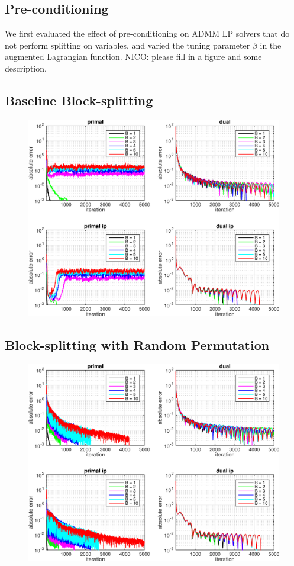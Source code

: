 \documentclass{article}
\begin{document}
\subsection*{Pre-conditioning}
We first evaluated the effect of pre-conditioning on ADMM LP solvers that do not perform splitting on variables, and varied the  tuning parameter $\beta$ in the augmented Lagrangian function.  {\color{red} NICO: please fill in a figure and some description.}

\subsection*{Baseline Block-splitting}
\begin{figure}[h]
	\includegraphics[width=\textwidth]{../figures/noprecond_norndperm.png}
	\label{fig:nop_nor}
\end{figure}
\subsection*{Block-splitting with Random Permutation}
\begin{figure}[h]
	\includegraphics[width=\textwidth]{../figures/noprecond_rndperm.png}
	\label{fig:nop_r}
\end{figure}
\end{document}
